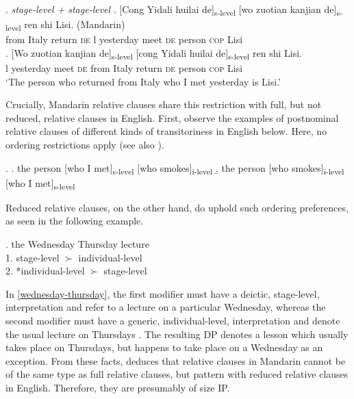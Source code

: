 \ex. \label{ex3} \emph{stage-level + stage-level} \label{s-s}
\ag. [Cong Yidali huilai de]\textsubscript{s-level} [wo zuotian kanjian de]\textsubscript{s-level} ren shi Lisi. (Mandarin)\\
from Italy return \textsc{de} l yesterday meet \textsc{de} person \textsc{cop} Lisi\\
\bg. [Wo zuotian kanjian de]\textsubscript{s-level} [cong Yidali huilai de]\textsubscript{s-level} ren shi Lisi.\\
l yesterday meet \textsc{de} from Italy return \textsc{de} person \textsc{cop} Lisi\\
`The person who returned from Italy who I met yesterday is Lisi.'

Crucially,  Mandarin relative clauses share this restriction with full, but not reduced, relative clauses in  English. First, observe the examples of postnominal relative clauses of different kinds of transitoriness in English below. Here, no ordering restrictions apply (see also \citealt{baker:2003:verbal}).

\ex. \a. the person [who I met]\textsubscript{s-level} [who smokes]\textsubscript{i-level}
\b. the person [who smokes]\textsubscript{i-level} [who I met]\textsubscript{s-level} \\ \null \hfill \citep[239]{cinque:2020:relcl}

Reduced relative clauses, on the other hand, do uphold such ordering preferences, as seen in the following example. 

\ex. the Wednesday Thursday lecture\\
1. stage-level $\succ$ individual-level\\
2. *individual-level $\succ$ stage-level \null \hfill \citep[112]{larson:2004:order} \label{wednesday-thursday}

In \ref{wednesday-thursday}, the first modifier must have a deictic, stage-level, interpretation and refer to a lecture on a particular Wednesday, whereas the second modifier must have a generic, individual-level, interpretation and denote the usual lecture on Thursdays \citep[239]{cinque:2020:relcl}. The resulting DP denotes a lesson which usually takes place on Thursdays, but happens to take place on a Wednesday as an exception. From these facts, \citet{cinque:2020:relcl} deduces that relative clauses in Mandarin cannot be of the same type as full relative clauses, but pattern with reduced relative clauses in English. Therefore, they are presumably of size IP.

